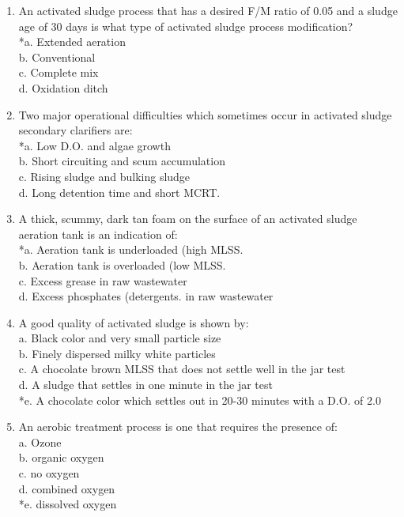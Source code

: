 \begin{enumerate}
\item An activated sludge process that has a desired F/M ratio of 0.05 and a sludge age of 30 days is what type of activated sludge process modification? \\
*a. Extended aeration \\
b. Conventional \\
c. Complete mix \\
d. Oxidation ditch \\

\item Two major operational difficulties which sometimes occur in activated sludge secondary clarifiers are: \\
*a. Low D.O. and algae growth \\
b. Short circuiting and scum accumulation \\
c. Rising sludge and bulking sludge \\
d. Long detention time and short MCRT. \\

\item A thick, scummy, dark tan foam on the surface of an activated sludge aeration tank is an indication of: \\
*a. Aeration tank is underloaded (high MLSS. \\
b. Aeration tank is overloaded (low MLSS. \\
c. Excess grease in raw wastewater \\
d. Excess phosphates (detergents. in raw wastewater \\

\item A good quality of activated sludge is shown by: \\
a. Black color and very small particle size \\
b. Finely dispersed milky white particles \\
c. A chocolate brown MLSS that does not settle well in the jar test \\
d. A sludge that settles in one minute in the jar test \\
*e. A chocolate color which settles out in 20-30 minutes with a D.O. of 2.0 \\

\item An aerobic treatment process is one that requires the presence of: \\
a. Ozone \\
b. organic oxygen \\
c. no oxygen \\
d. combined oxygen \\
*e. dissolved oxygen \\


\end{enumerate}

